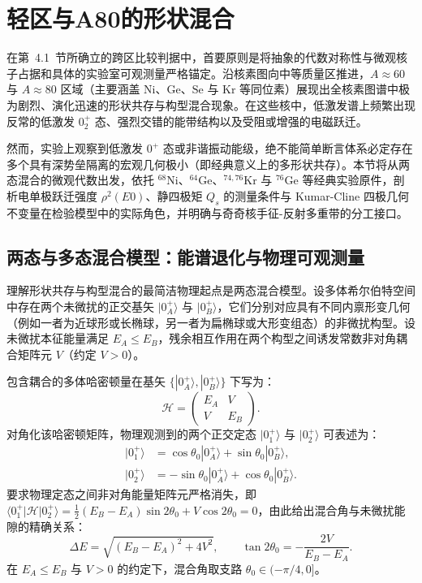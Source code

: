 \section{轻区与A80的形状混合}\label{sec:4-2}

在第~4.1~节所确立的跨区比较判据中，首要原则是将抽象的代数对称性与微观核子占据和具体的实验室可观测量严格锚定。沿核素图向中等质量区推进，$A\approx 60$ 与 $A\approx 80$ 区域（主要涵盖 $\mathrm{Ni}$、$\mathrm{Ge}$、$\mathrm{Se}$ 与 $\mathrm{Kr}$ 等同位素）展现出全核素图谱中极为剧烈、演化迅速的形状共存与构型混合现象。在这些核中，低激发谱上频繁出现反常的低激发 $0^+_2$ 态、强烈交错的能带结构以及受阻或增强的电磁跃迁。

然而，实验上观察到低激发 $0^+$ 态或非谐振动能级，绝不能简单断言体系必定存在多个具有深势垒隔离的宏观几何极小（即经典意义上的多形状共存）。本节将从两态混合的微观代数出发，依托 $^{68}\mathrm{Ni}$、$^{64}\mathrm{Ge}$、$^{74,76}\mathrm{Kr}$ 与 $^{76}\mathrm{Ge}$ 等经典实验原件，剖析电单极跃迁强度 $\rho^2(E0)$、静四极矩 $Q_s$ 的测量条件与 Kumar-Cline 四极几何不变量在检验模型中的实际角色，并明确与奇奇核手征-反射多重带的分工接口。

\subsection{两态与多态混合模型：能谱退化与物理可观测量}\label{sec:4-2-1}

理解形状共存与构型混合的最简洁物理起点是两态混合模型。设多体希尔伯特空间中存在两个未微扰的正交基矢 $|0^+_A\rangle$ 与 $|0^+_B\rangle$，它们分别对应具有不同内禀形变几何（例如一者为近球形或长椭球，另一者为扁椭球或大形变组态）的非微扰构型。设未微扰本征能量满足 $E_A \le E_B$，残余相互作用在两个构型之间诱发常数非对角耦合矩阵元 $V$（约定 $V > 0$）。

包含耦合的多体哈密顿量在基矢 $\{|0^+_A\rangle, |0^+_B\rangle\}$ 下写为：
\begin{equation}\label{eq:4-2-two-state-H}
\mathcal{H} = \begin{pmatrix} E_A & V \\ V & E_B \end{pmatrix}.
\end{equation}
对角化该哈密顿矩阵，物理观测到的两个正交定态 $|0^+_1\rangle$ 与 $|0^+_2\rangle$ 可表述为：
\begin{equation}\label{eq:4-2-two-state-states}
\begin{aligned}
|0^+_1\rangle &= \cos\theta_0 |0^+_A\rangle + \sin\theta_0 |0^+_B\rangle, \\
|0^+_2\rangle &= -\sin\theta_0 |0^+_A\rangle + \cos\theta_0 |0^+_B\rangle.
\end{aligned}
\end{equation}
要求物理定态之间非对角能量矩阵元严格消失，即 $\langle 0^+_1 | \mathcal{H} | 0^+_2 \rangle = \frac{1}{2}(E_B - E_A)\sin 2\theta_0 + V\cos 2\theta_0 = 0$，由此给出混合角与未微扰能隙的精确关系：
\begin{equation}\label{eq:4-2-two-state-mixing}
\Delta E = \sqrt{(E_B - E_A)^2 + 4V^2}, \qquad \tan 2\theta_0 = -\frac{2V}{E_B - E_A}.
\end{equation}
在 $E_A \le E_B$ 与 $V > 0$ 的约定下，混合角取支路 $\theta_0 \in (-\pi/4, 0]$。

